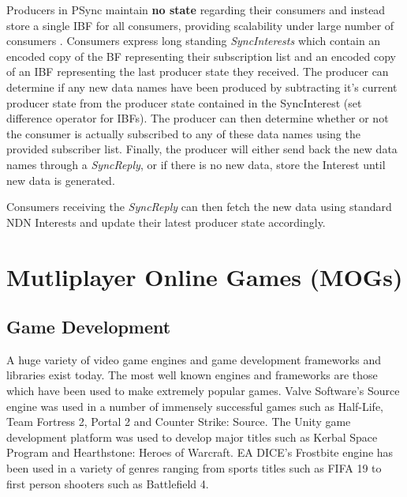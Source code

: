 Producers in PSync maintain \textbf{no state} regarding their consumers and instead store a single IBF for all consumers, providing scalability under large number of consumers \cite{psync}. Consumers express long standing \textit{SyncInterests} which contain an encoded copy of the BF representing their subscription list and an encoded copy of an IBF representing the last producer state they received. The producer can determine if any new data names have been produced by subtracting it's current producer state from the producer state contained in the SyncInterest (set difference operator for IBFs). The producer can then determine whether or not the consumer is actually subscribed to any of these data names using the provided subscriber list. Finally, the producer will either send back the new data names through a \textit{SyncReply}, or if there is no new data, store the Interest until new data is generated.

Consumers receiving the \textit{SyncReply} can then fetch the new data using standard NDN Interests and update their latest producer state accordingly. 







\section{Mutliplayer Online Games (MOGs)}\label{sec:mogs}


\subsection{Game Development}
A huge variety of video game engines and game development frameworks and libraries exist today. The most well known engines and frameworks are those which have been used to make extremely popular games. Valve Software's Source engine was used in a number of immensely successful games such as Half-Life, Team Fortress 2, Portal 2 and Counter Strike: Source. The Unity game development platform was used to develop major titles such as Kerbal Space Program and Hearthstone: Heroes of Warcraft. EA DICE's Frostbite engine has been used in a variety of genres ranging from sports titles such as FIFA 19 to first person shooters such as Battlefield 4. 

